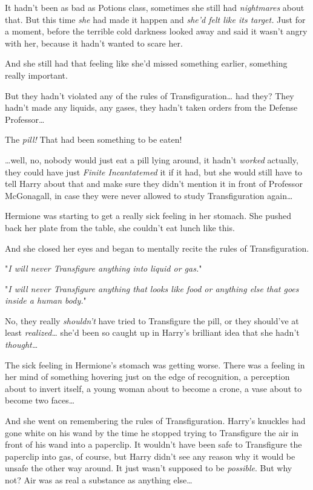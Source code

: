 It hadn't been as bad as Potions class, sometimes she still had 
\emph{nightmares} about that. But this time \emph{she} had made it happen and 
\emph{she'd felt like its target.} Just for a moment, before the terrible cold 
darkness looked away and said it wasn't angry with her, because it hadn't 
wanted to scare her.

And she still had that feeling like she'd missed something earlier, something 
really important.

But they hadn't violated any of the rules of Transfiguration{\ldots} had they? 
They hadn't made any liquids, any gases, they hadn't taken orders from the 
Defense Professor{\ldots}

The \emph{pill!} That had been something to be eaten!

{\ldots}well, no, nobody would just eat a pill lying around, it hadn't 
\emph{worked} actually, they could have just \emph{Finite Incantatemed} it if 
it had, but she would still have to tell Harry about that and make sure they 
didn't mention it in front of Professor McGonagall, in case they were never 
allowed to study Transfiguration again{\ldots}

Hermione was starting to get a really sick feeling in her stomach. She pushed 
back her plate from the table, she couldn't eat lunch like this.

And she closed her eyes and began to mentally recite the rules of 
Transfiguration.

"\emph{I will never Transfigure anything into liquid or gas.}"

"\emph{I will never Transfigure anything that looks like food or anything else 
that goes inside a human body.}"

No, they really \emph{shouldn't} have tried to Transfigure the pill, or they 
should've at least \emph{realized{\ldots}} she'd been so caught up in Harry's 
brilliant idea that she hadn't \emph{thought{\ldots}}

The sick feeling in Hermione's stomach was getting worse. There was a feeling 
in her mind of something hovering just on the edge of recognition, a perception 
about to invert itself, a young woman about to become a crone, a vase about to 
become two faces{\ldots}

And she went on remembering the rules of Transfiguration.
\sbreak
Harry's knuckles had gone white on his wand by the time he stopped trying to 
Transfigure the air in front of his wand into a paperclip. It wouldn't have 
been safe to Transfigure the paperclip into gas, of course, but Harry didn't 
see any reason why it would be unsafe the other way around. It just wasn't 
supposed to be \emph{possible}. But why not? Air was as real a substance as 
anything else{\ldots}

